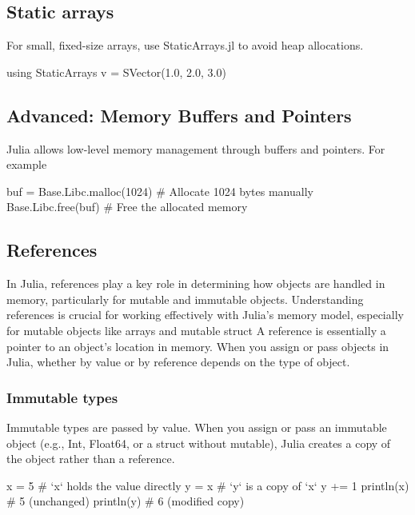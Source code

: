 \documentclass{report}
\begin{document}
     \bigbreak \noindent 
     \subsection{Static arrays}
     \bigbreak \noindent 
     For small, fixed-size arrays, use StaticArrays.jl to avoid heap allocations.
     \bigbreak \noindent 
     \begin{jlcode}
         using StaticArrays
         v = SVector(1.0, 2.0, 3.0)
     \end{jlcode}

     \bigbreak \noindent 
     \subsection{Advanced: Memory Buffers and Pointers}
     \bigbreak \noindent 
     Julia allows low-level memory management through buffers and pointers. For example
     \bigbreak \noindent 
     \begin{jlcode}
         buf = Base.Libc.malloc(1024)  # Allocate 1024 bytes manually
         Base.Libc.free(buf)          # Free the allocated memory
     \end{jlcode}

     \bigbreak \noindent 
     \subsection{References}
     \bigbreak \noindent 
     In Julia, references play a key role in determining how objects are handled in memory, particularly for mutable and immutable objects. Understanding references is crucial for working effectively with Julia's memory model, especially for mutable objects like arrays and mutable struct
     \bigbreak \noindent 
     A reference is essentially a pointer to an object's location in memory. When you assign or pass objects in Julia, whether by value or by reference depends on the type of object.
     \bigbreak \noindent 
     \subsubsection{Immutable types}
     \bigbreak \noindent 
     Immutable types are passed by value. When you assign or pass an immutable object (e.g., Int, Float64, or a struct without mutable), Julia creates a copy of the object rather than a reference.
     \bigbreak \noindent 
     \begin{jlcode}
         x = 5  # `x` holds the value directly
         y = x  # `y` is a copy of `x`
         y += 1
         println(x)  # 5 (unchanged)
         println(y)  # 6 (modified copy)
     \end{jlcode}
\end{document}
